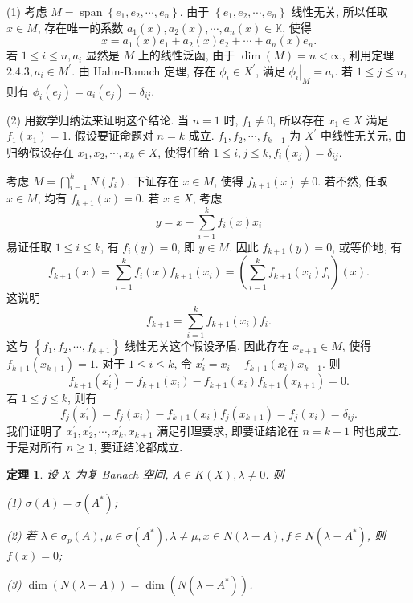 \documentclass[openany]{ctexbook}
\makeatletter
\theoremstyle{kaiti}
\newtheorem{theorem}{定理}[section]
\theoremstyle{normal}
\renewenvironment{proof}[1][\proofname]{\par
    \pushQED{\qed}%
    \normalfont \topsep6\p@\@plus6\p@\relax
    \trivlist
    \item\relax
    {\heiti #1}\hspace{2\labelsep}\ignorespaces
  }{%
    \popQED\endtrivlist\@endpefalse
  }
\makeatother
\begin{document}
\begin{proof}
(1) 考虑 $M=\operatorname{span}\left\{e_1, e_2, \cdots, e_n\right\}$. 由于 $\left\{e_1, e_2, \cdots, e_n\right\}$ 线性无关, 所以任取 $x \in M$, 存在唯一的系数 $a_1(x), a_2(x), \cdots, a_n(x) \in \mathbb{K}$, 使得
$$
x=a_1(x) e_1+a_2(x) e_2+\cdots+a_n(x) e_n.
$$
若 $1 \leqslant i \leqslant n, a_{i}$ 显然是 $M$ 上的线性泛函, 由于 $\operatorname{dim}(M)=n<\infty$, 利用定理 $2.4.3, a_{i} \in M^{\prime}$. 由 Hahn-Banach 定理, 存在 $\phi_{i} \in X^{\prime}$, 满足 $\left.\phi_{i}\right|_{M}=a_{i}$. 若 $1 \leqslant j \leqslant n$, 则有 $\phi_{i}\left(e_{j}\right)=a_{i}\left(e_{j}\right)=\delta_{i j}$.

(2) 用数学归纳法来证明这个结论. 当 $n=1$ 时, $f_1 \neq 0$, 所以存在 $x_1 \in X$ 满足 $f_1\left(x_1\right)=1$. 假设要证命题对 $n=k$ 成立. $f_1, f_2, \cdots, f_{k+1}$ 为 $X^{\prime}$ 中线性无关元, 由归纳假设存在 $x_1, x_2, \cdots, x_{k} \in X$, 使得任给 $1 \leqslant i, j \leqslant k, f_{i}\left(x_{j}\right)=\delta_{i j}$.

考虑 $M=\bigcap_{i=1}^{k} N\left(f_{i}\right)$. 下证存在 $x \in M$, 使得 $f_{k+1}(x) \neq 0$. 若不然, 任取 $x \in M$, 均有 $f_{k+1}(x)=0$. 若 $x \in X$, 考虑
$$
y=x-\sum_{i=1}^{k} f_{i}(x) x_{i}
$$
易证任取 $1 \leqslant i \leqslant k$, 有 $f_{i}(y)=0$, 即 $y \in M$. 因此 $f_{k+1}(y)=0$, 或等价地, 有
$$
f_{k+1}(x)=\sum_{i=1}^{k} f_{i}(x) f_{k+1}\left(x_{i}\right)=\left(\sum_{i=1}^{k} f_{k+1}\left(x_{i}\right) f_{i}\right)(x).
$$
这说明
$$
f_{k+1}=\sum_{i=1}^{k} f_{k+1}\left(x_{i}\right) f_{i}.
$$
这与 $\left\{f_1, f_2, \cdots, f_{k+1}\right\}$ 线性无关这个假设矛盾. 因此存在 $x_{k+1} \in M$, 使得 $f_{k+1}\left(x_{k+1}\right)=1$.
对于 $1 \leqslant i \leqslant k$, 令 $x_{i}^{\prime}=x_{i}-f_{k+1}\left(x_{i}\right) x_{k+1}$. 则
$$
f_{k+1}\left(x_{i}^{\prime}\right)=f_{k+1}\left(x_{i}\right)-f_{k+1}\left(x_{i}\right) f_{k+1}\left(x_{k+1}\right)=0.
$$
若 $1 \leqslant j \leqslant k$, 则有
$$
f_{j}\left(x_{i}^{\prime}\right)=f_{j}\left(x_{i}\right)-f_{k+1}\left(x_{i}\right) f_{j}\left(x_{k+1}\right)=f_{j}\left(x_{i}\right)=\delta_{i j}.
$$
我们证明了 $x_1^{\prime}, x_2^{\prime}, \cdots, x_{k}^{\prime}, x_{k+1}$ 满足引理要求, 即要证结论在 $n=k+1$ 时也成立. 于是对所有 $n \geqslant 1$, 要证结论都成立.
\end{proof}

\begin{theorem}
设 $X$ 为复 Banach 空间, $A \in K(X), \lambda \neq 0$. 则

(1) $\sigma(A)=\sigma\left(A^{*}\right)$;

(2) 若 $\lambda \in \sigma_{p}(A), \mu \in \sigma\left(A^{*}\right), \lambda \neq \mu, x \in N(\lambda-A), f \in N\left(\lambda-A^{*}\right)$, 则 $f(x)=0$;

(3) $\operatorname{dim}(N(\lambda-A))=\operatorname{dim}\left(N\left(\lambda-A^{*}\right)\right)$.
\end{theorem}
\end{document}

